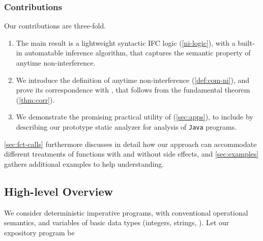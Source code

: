 \subsubsection{Contributions} %
Our contributions are three-fold.

\begin{enumerate}
\item The main result is a lightweight syntactic IFC logic \lname (\autoref{ni-logic}),
with a built-in automatable inference algorithm, that captures the semantic property of anytime non-interference.

\item We introduce the definition of anytime non-interference (\autoref{def:com-ni}),
and prove its correspondence with \lname, that follows from the fundamental theorem (\autoref{thm:corr}).

\item We demonstrate the promising practical utility of \lname (\autoref{sec:apps}),
to include by describing our prototype static analyzer \tool for analysis of \texttt{Java} programs.
\end{enumerate}

\autoref{sec:fct-calls} furthermore discusses in detail how our approach can accommodate different treatments of functions with and without side effects, and \autoref{sec:examples} gathers additional examples to help understanding.



\subsection{High-level Overview}
\label{sec:overview}

We consider deterministic imperative programs, with conventional operational semantics, and variables of basic data types (integers, strings, \etc).
Let our expository program be

